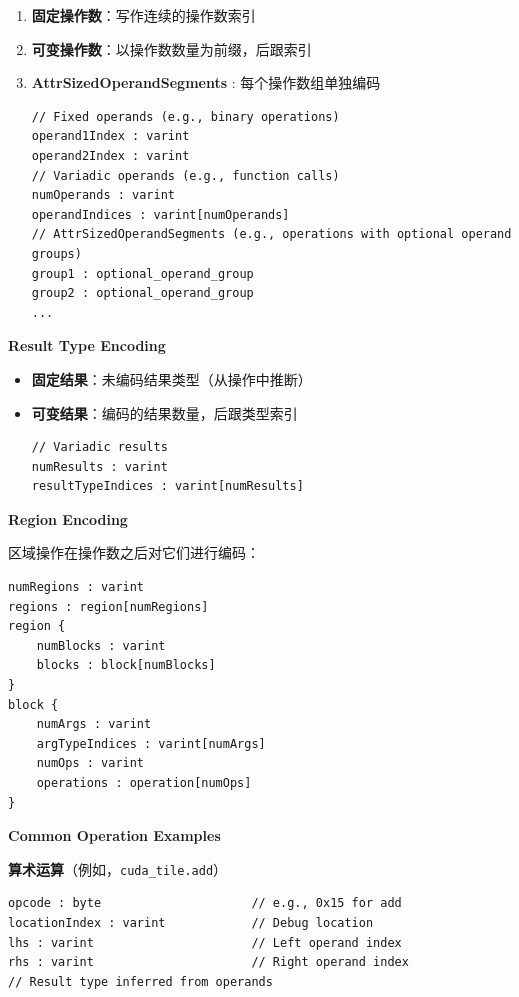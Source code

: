 \documentclass{article}
\begin{document}
\begin{enumerate}
\item \textbf{固定操作数}：写作连续的操作数索引
\item \textbf{可变操作数}：以操作数数量为前缀，后跟索引
\item \textbf{AttrSizedOperandSegments} : 每个操作数组单独编码

\begin{lstlisting}
// Fixed operands (e.g., binary operations)
operand1Index : varint
operand2Index : varint
// Variadic operands (e.g., function calls)
numOperands : varint
operandIndices : varint[numOperands]
// AttrSizedOperandSegments (e.g., operations with optional operand groups)
group1 : optional_operand_group
group2 : optional_operand_group
...
\end{lstlisting}

\end{enumerate}
\textbf{Result Type Encoding}


\begin{itemize}
\item \textbf{固定结果}：未编码结果类型（从操作中推断）
\item \textbf{可变结果}：编码的结果数量，后跟类型索引

\begin{lstlisting}
// Variadic results
numResults : varint
resultTypeIndices : varint[numResults]
\end{lstlisting}

\end{itemize}
\textbf{Region Encoding}


区域操作在操作数之后对它们进行编码：


\begin{lstlisting}
numRegions : varint
regions : region[numRegions]
region {
    numBlocks : varint
    blocks : block[numBlocks]
}
block {
    numArgs : varint
    argTypeIndices : varint[numArgs]
    numOps : varint
    operations : operation[numOps]
}
\end{lstlisting}

\textbf{Common Operation Examples}


\textbf{算术运算}（例如，\texttt{cuda\_tile.add}）


\begin{lstlisting}
opcode : byte                     // e.g., 0x15 for add
locationIndex : varint            // Debug location
lhs : varint                      // Left operand index
rhs : varint                      // Right operand index
// Result type inferred from operands
\end{lstlisting}
\end{document}
